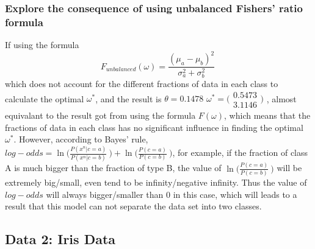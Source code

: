 \documentclass[a4paper, 12pt]{article}
\begin{document}
    \subsubsection{Explore the consequence of using unbalanced Fishers' ratio formula}
      If using the formula
      \begin{equation*}
        F_{unbalanced}(\omega) = \frac{(\mu_a-\mu_b)^2}{\sigma^2_a+\sigma^2_b} \
      \end{equation*}
      which does not account for the different fractions of data in each class to calculate the optimal $\omega^*$, and the result is 
      $\theta=0.1478$
      $\omega^*=\Big(
      \begin{array}{cc}
        0.5473 \\
        3.1146
      \end{array}
      \Big)$
      , almost equivalant to the result got from using the formula $F(\omega)$, which means that the fractions of data in each class has no significant influence in finding the optimal $\omega^*$. However, according to Bayes' rule, $log-odds = \ln\bigg(\frac{P(x^n|c=a)}{P(x^n|c=b)}\ \bigg) + \ln\bigg(\frac{P(c=a)}{P(c=b)}\ \bigg)$, for example, if the fraction of class A is much bigger than the fraction of type B, the value of  $\ln\bigg( \frac{P(c=a)}{P(c=b)}\ \bigg)$ will be extremely big/small, even tend to be infinity/negative infinity. Thus the value of $log-odds$ will always bigger/smaller than 0 in this case, which will leads to a result that this model can not separate the data set into two classes. 

  

  \subsection{Data 2: Iris Data}
\end{document}
